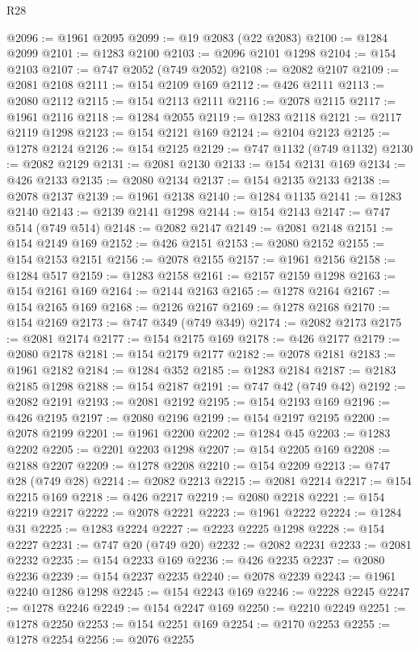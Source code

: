 \begin{lexlean}{R28}
\begin{coremodule}
@2096 := @1961 @2095
@2099 := @19 @2083 (@22 @2083)
@2100 := @1284 @2099
@2101 := @1283 @2100
@2103 := @2096 @2101 @1298
@2104 := @154 @2103
@2107 := @747 @2052 (@749 @2052)
@2108 := @2082 @2107
@2109 := @2081 @2108
@2111 := @154 @2109 @169
@2112 := @426 @2111
@2113 := @2080 @2112
@2115 := @154 @2113 @2111
@2116 := @2078 @2115
@2117 := @1961 @2116
@2118 := @1284 @2055
@2119 := @1283 @2118
@2121 := @2117 @2119 @1298
@2123 := @154 @2121 @169
@2124 := @2104 @2123
@2125 := @1278 @2124
@2126 := @154 @2125
@2129 := @747 @1132 (@749 @1132)
@2130 := @2082 @2129
@2131 := @2081 @2130
@2133 := @154 @2131 @169
@2134 := @426 @2133
@2135 := @2080 @2134
@2137 := @154 @2135 @2133
@2138 := @2078 @2137
@2139 := @1961 @2138
@2140 := @1284 @1135
@2141 := @1283 @2140
@2143 := @2139 @2141 @1298
@2144 := @154 @2143
@2147 := @747 @514 (@749 @514)
@2148 := @2082 @2147
@2149 := @2081 @2148
@2151 := @154 @2149 @169
@2152 := @426 @2151
@2153 := @2080 @2152
@2155 := @154 @2153 @2151
@2156 := @2078 @2155
@2157 := @1961 @2156
@2158 := @1284 @517
@2159 := @1283 @2158
@2161 := @2157 @2159 @1298
@2163 := @154 @2161 @169
@2164 := @2144 @2163
@2165 := @1278 @2164
@2167 := @154 @2165 @169
@2168 := @2126 @2167
@2169 := @1278 @2168
@2170 := @154 @2169
@2173 := @747 @349 (@749 @349)
@2174 := @2082 @2173
@2175 := @2081 @2174
@2177 := @154 @2175 @169
@2178 := @426 @2177
@2179 := @2080 @2178
@2181 := @154 @2179 @2177
@2182 := @2078 @2181
@2183 := @1961 @2182
@2184 := @1284 @352
@2185 := @1283 @2184
@2187 := @2183 @2185 @1298
@2188 := @154 @2187
@2191 := @747 @42 (@749 @42)
@2192 := @2082 @2191
@2193 := @2081 @2192
@2195 := @154 @2193 @169
@2196 := @426 @2195
@2197 := @2080 @2196
@2199 := @154 @2197 @2195
@2200 := @2078 @2199
@2201 := @1961 @2200
@2202 := @1284 @45
@2203 := @1283 @2202
@2205 := @2201 @2203 @1298
@2207 := @154 @2205 @169
@2208 := @2188 @2207
@2209 := @1278 @2208
@2210 := @154 @2209
@2213 := @747 @28 (@749 @28)
@2214 := @2082 @2213
@2215 := @2081 @2214
@2217 := @154 @2215 @169
@2218 := @426 @2217
@2219 := @2080 @2218
@2221 := @154 @2219 @2217
@2222 := @2078 @2221
@2223 := @1961 @2222
@2224 := @1284 @31
@2225 := @1283 @2224
@2227 := @2223 @2225 @1298
@2228 := @154 @2227
@2231 := @747 @20 (@749 @20)
@2232 := @2082 @2231
@2233 := @2081 @2232
@2235 := @154 @2233 @169
@2236 := @426 @2235
@2237 := @2080 @2236
@2239 := @154 @2237 @2235
@2240 := @2078 @2239
@2243 := @1961 @2240 @1286 @1298
@2245 := @154 @2243 @169
@2246 := @2228 @2245
@2247 := @1278 @2246
@2249 := @154 @2247 @169
@2250 := @2210 @2249
@2251 := @1278 @2250
@2253 := @154 @2251 @169
@2254 := @2170 @2253
@2255 := @1278 @2254
@2256 := @2076 @2255

\end{coremodule}
\end{lexlean}
